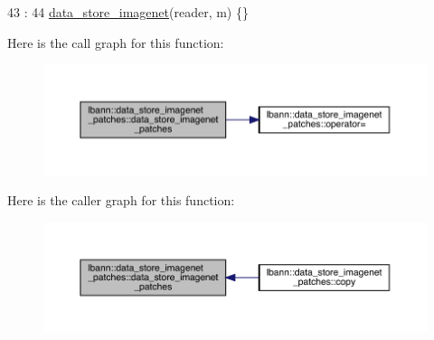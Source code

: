 \begin{DoxyCode}
43                                                                      :
44     \hyperlink{classlbann_1_1data__store__imagenet_a3040285850664ccecb4795df3c85fb8d}{data\_store\_imagenet}(reader, m) \{\}
\end{DoxyCode}
Here is the call graph for this function\+:\nopagebreak
\begin{figure}[H]
\begin{center}
\leavevmode
\includegraphics[width=350pt]{classlbann_1_1data__store__imagenet__patches_ac98e8ba382516df619d24e67881df1eb_cgraph}
\end{center}
\end{figure}
Here is the caller graph for this function\+:\nopagebreak
\begin{figure}[H]
\begin{center}
\leavevmode
\includegraphics[width=350pt]{classlbann_1_1data__store__imagenet__patches_ac98e8ba382516df619d24e67881df1eb_icgraph}
\end{center}
\end{figure}
\mbox{\label{classlbann_1_1data__store__imagenet__patches_abaeae23e871e45836f5757fb50c25114}} 
